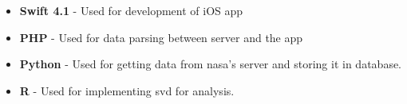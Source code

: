 \begin{itemize}
    \item \textbf{Swift 4.1} - Used for development of iOS app \\
    \item \textbf{PHP} - Used for data parsing between server and the app \\
    \item \textbf{Python} - Used for getting data from \gls{nasa}'s server and storing it in database. \\
    \item \textbf{R} - Used for implementing \gls{svd} for analysis. \\
\end{itemize}
